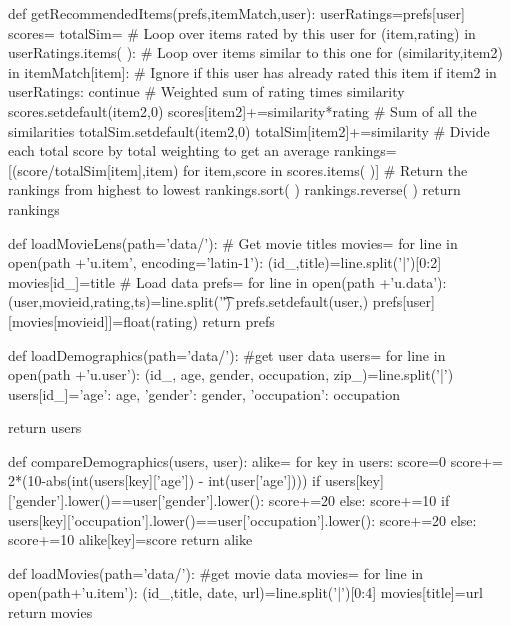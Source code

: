 \documentclass[12pt, letterpaper]{article}
\begin{document}
\begin{MyPython}[caption= Recommendations.py, label=lst:Recommendationspy]
def getRecommendedItems(prefs,itemMatch,user):
    userRatings=prefs[user]
    scores={}
    totalSim={}
    # Loop over items rated by this user
    for (item,rating) in userRatings.items( ):
        # Loop over items similar to this one
        for (similarity,item2) in itemMatch[item]:
            # Ignore if this user has already rated this item
            if item2 in userRatings:
                continue
            # Weighted sum of rating times similarity
            scores.setdefault(item2,0)
            scores[item2]+=similarity*rating
            # Sum of all the similarities
            totalSim.setdefault(item2,0)
            totalSim[item2]+=similarity
    # Divide each total score by total weighting to get an average
    rankings=[(score/totalSim[item],item)
              for item,score in scores.items( )]
    # Return the rankings from highest to lowest
    rankings.sort( )
    rankings.reverse( )
    return rankings


def loadMovieLens(path='data/'):
    # Get movie titles
    movies={}
    for line in open(path +'u.item', encoding='latin-1'):
        (id_,title)=line.split('|')[0:2]
        movies[id_]=title
    # Load data
    prefs={}
    for line in open(path +'u.data'):
        (user,movieid,rating,ts)=line.split('\t')
        prefs.setdefault(user,{})
        prefs[user][movies[movieid]]=float(rating)
    return prefs


def loadDemographics(path='data/'):
    #get user data
    users={}
    for line in open(path +'u.user'):
        (id_, age, gender, occupation, zip_)=line.split('|')
        users[id_]={'age': age, 'gender': gender, 'occupation': occupation}

    return users

def compareDemographics(users, user):
        alike={}
        for key in users:
            score=0
            score+= 2*(10-abs(int(users[key]['age']) - int(user['age'])))
            if users[key]['gender'].lower()==user['gender'].lower():
                score+=20
            else: score+=10
            if users[key]['occupation'].lower()==user['occupation'].lower():
                score+=20
            else: score+=10
            alike[key]=score
        return alike

def loadMovies(path='data/'):
    #get movie data
    movies={}
    for line in open(path+'u.item'):
        (id_,title, date, url)=line.split('|')[0:4]
        movies[title]=url
    return movies
\end{MyPython}
\end{document}
